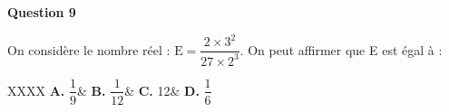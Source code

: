 \documentclass[10pt]{article}
\begin{document}
	\medskip

	\textbf{Question 9}

	On considère le nombre réel : \quad $\text{E} =\dfrac{2 \times 3^{2}}{27 \times 2^{3}}$. \quad On peut affirmer que E est égal à :

	\begin{tblr}{XXXX}
		\textbf{A.} $\dfrac{1}{9}$&
		\textbf{B.} $\dfrac{1}{12}$&
		\textbf{C.} 12&
		\textbf{D.} $\dfrac{1}{6}$
	\end{tblr}
\end{document}
